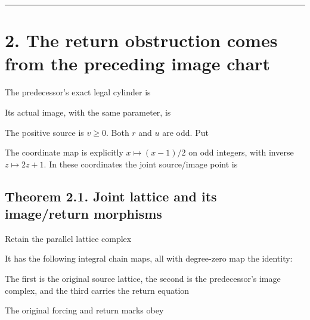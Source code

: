 \begin{center}\rule{0.5\linewidth}{0.5pt}\end{center}

\section{2. The return obstruction comes from the preceding image chart}

The predecessor's exact legal cylinder is


Its actual image, with the same parameter, is


The positive source is \(v\ge0\). Both \(r\) and \(u\) are odd. Put


The coordinate map is explicitly \(x\mapsto(x-1)/2\) on odd integers,
with inverse \(z\mapsto2z+1\). In these coordinates the joint
source/image point is


\subsection{Theorem 2.1. Joint lattice and its image/return morphisms}

Retain the parallel lattice complex


It has the following integral chain maps, all with degree-zero map the
identity:


The first is the original source lattice, the second is the
predecessor's image complex, and the third carries the return equation


The original forcing and return marks obey


